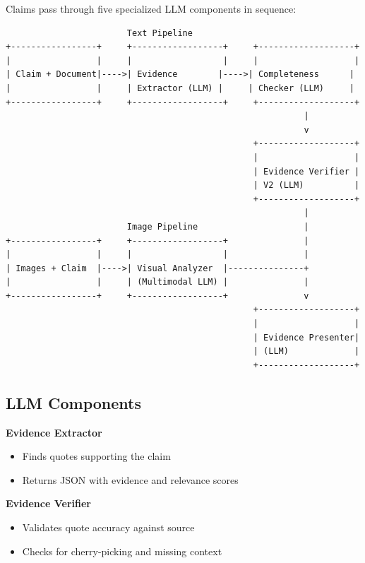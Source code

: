 \documentclass[11pt]{article}
\begin{document}
Claims pass through five specialized LLM components in sequence:

\newpage
\begin{verbatim}
                        Text Pipeline
+-----------------+     +------------------+     +-------------------+
|                 |     |                  |     |                   |
| Claim + Document|---->| Evidence        |---->| Completeness      |
|                 |     | Extractor (LLM) |     | Checker (LLM)     |
+-----------------+     +------------------+     +-------------------+
                                                           |
                                                           v
                                                 +-------------------+
                                                 |                   |
                                                 | Evidence Verifier |
                                                 | V2 (LLM)          |
                                                 +-------------------+
                                                           |
                        Image Pipeline                     |
+-----------------+     +------------------+               |
|                 |     |                  |               |
| Images + Claim  |---->| Visual Analyzer  |---------------+
|                 |     | (Multimodal LLM) |               |
+-----------------+     +------------------+               v
                                                 +-------------------+
                                                 |                   |
                                                 | Evidence Presenter|
                                                 | (LLM)             |
                                                 +-------------------+
\end{verbatim}

\subsection{LLM Components}

\textbf{Evidence Extractor}
\begin{itemize}
\item Finds quotes supporting the claim
\item Returns JSON with evidence and relevance scores
\end{itemize}

\textbf{Evidence Verifier}
\begin{itemize}
\item Validates quote accuracy against source
\item Checks for cherry-picking and missing context
\end{itemize}
\end{document}
